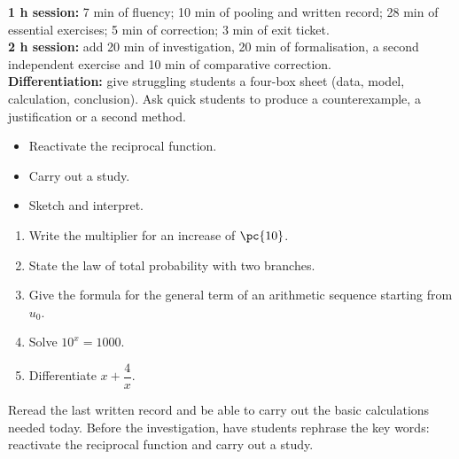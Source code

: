 \ifmxteacher
\begin{method}
\textbf{1 h session:} 7 min of fluency; 10 min of pooling and written record; 28 min of essential exercises; 5 min of correction; 3 min of exit ticket.\\
\textbf{2 h session:} add 20 min of investigation, 20 min of formalisation, a second independent exercise and 10 min of comparative correction.\\
\textbf{Differentiation:} give struggling students a four-box sheet (data, model, calculation, conclusion). Ask quick students to produce a counterexample, a justification or a second method.
\end{method}
\fi
{}
\begin{objectives}\begin{itemize}\item Reactivate the reciprocal function.\item Carry out a study.\item Sketch and interpret.\end{itemize}\end{objectives}
\begin{fluency}\begin{enumerate}\item Write the multiplier for an increase of $\pc{10}$. \item State the law of total probability with two branches. \item Give the formula for the general term of an arithmetic sequence starting from $u_0$. \item Solve $10^x=1000$. \item Differentiate $x+\dfrac4x$. \end{enumerate}\end{fluency}
\begin{prerequisites}Reread the last written record and be able to carry out the basic calculations needed today. Before the investigation, have students rephrase the key words: reactivate the reciprocal function and carry out a study.\end{prerequisites}

